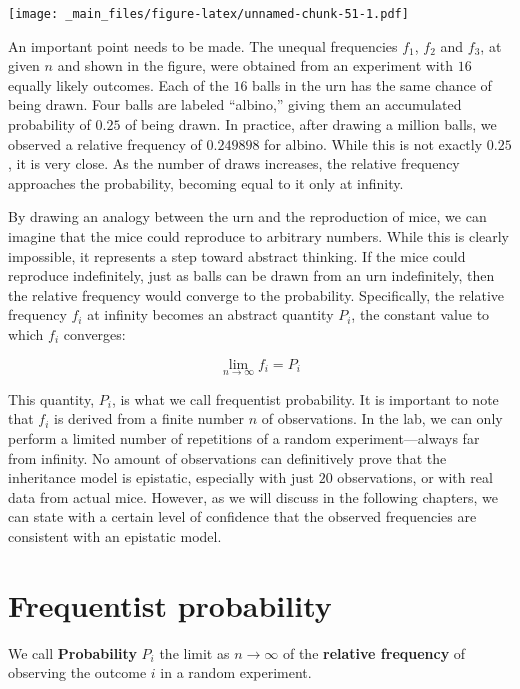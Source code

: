 \documentclass[
]{book}
\begin{document}
\texttt{[image: \_main\_files/figure-latex/unnamed-chunk-51-1.pdf]}

An important point needs to be made. The unequal frequencies \(f_1\), \(f_2\) and \(f_3\), at given \(n\) and shown in the figure, were obtained from an experiment with \(16\) equally likely outcomes. Each of the \(16\) balls in the urn has the same chance of being drawn. Four balls are labeled ``albino,'' giving them an accumulated probability of \(0.25\) of being drawn. In practice, after drawing a million balls, we observed a relative frequency of \(0.249898\) for albino. While this is not exactly \(0.25\), it is very close. As the number of draws increases, the relative frequency approaches the probability, becoming equal to it only at infinity.

By drawing an analogy between the urn and the reproduction of mice, we can imagine that the mice could reproduce to arbitrary numbers. While this is clearly impossible, it represents a step toward abstract thinking. If the mice could reproduce indefinitely, just as balls can be drawn from an urn indefinitely, then the relative frequency would converge to the probability. Specifically, the relative frequency \(f_i\) at infinity becomes an abstract quantity \(P_i\), the constant value to which \(f_i\) converges:

\[\lim_{n \to \infty} f_i = P_i\]

This quantity, \(P_i\), is what we call frequentist probability. It is important to note that \(f_i\) is derived from a finite number \(n\) of observations. In the lab, we can only perform a limited number of repetitions of a random experiment---always far from infinity. No amount of observations can definitively prove that the inheritance model is epistatic, especially with just \(20\) observations, or with real data from actual mice. However, as we will discuss in the following chapters, we can state with a certain level of confidence that the observed frequencies are consistent with an epistatic model.

\hypertarget{frequentist-probability}{%
\section{Frequentist probability}\label{frequentist-probability}}

We call \textbf{Probability} \(P_i\) the limit as \(n \rightarrow \infty\) of the \textbf{relative frequency} of observing the outcome \(i\) in a random experiment.
\end{document}

